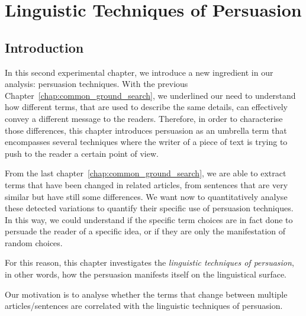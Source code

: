 \chapter{\statusorange Linguistic Techniques of Persuasion}
\label{chap:linguistic_persuasion}

\section{\statusgreen Introduction}
\label{sec:lp_intro}

In this second experimental chapter, we introduce a new ingredient in our analysis: persuasion techniques.
With the previous Chapter~\ref{chap:common_ground_search}, we underlined our need to understand how different terms, that are used to describe the same details, can effectively convey a different message to the readers.
Therefore, in order to characterise those differences, this chapter introduces \gls{persuasion} as an umbrella term that encompasses several techniques where the writer of a piece of text is trying to push to the reader a certain point of view.

From the last chapter~\ref{chap:common_ground_search}, 
we are able to extract terms that have been changed in related articles, from sentences that are very similar but have still some differences.
We want now to quantitatively analyse these detected variations to quantify their specific use of persuasion techniques.
In this way, we could understand if the specific term choices are in fact done to persuade the reader of a specific idea, or if they are only the manifestation of random choices.

For this reason, this chapter investigates the \emph{linguistic techniques of persuasion}, in other words, how the persuasion manifests itself on the linguistical surface.

Our motivation is to analyse whether the terms that change between multiple articles/sentences are correlated with the linguistic techniques of persuasion.


